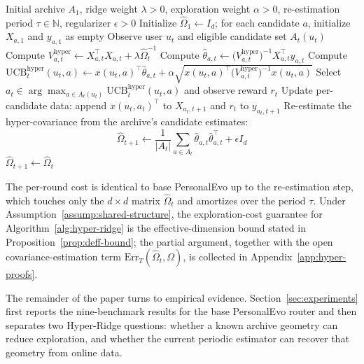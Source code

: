 \documentclass{article} %
\providecommand{\Err}{\mathrm{Err}}
\begin{document}
\begin{algorithm}[t]
\caption{Hyper-Ridge PersonalEvo routing}
\label{alg:hyper-ridge}
\begin{algorithmic}[1]
\Require Initial archive $A_1$, ridge weight $\lambda > 0$, exploration
  weight $\alpha > 0$, re-estimation period $\tau \in \mathbb{N}$,
  regularizer $\epsilon > 0$
\State Initialize $\widehat{\Omega}_1 \gets I_d$; for each candidate $a$,
  initialize $X_{a,1}$ and $y_{a,1}$ as empty
  \State Observe user $u_t$ and eligible candidate set $A_t(u_t)$
    \State Compute
      $V_{a,t}^{\mathrm{hyper}} \gets X_{a,t}^\top X_{a,t}
        + \lambda \widehat{\Omega}_t^{-1}$
    \State Compute
      $\widehat{\theta}_{a,t} \gets
        \bigl( V_{a,t}^{\mathrm{hyper}} \bigr)^{-1}
        X_{a,t}^\top y_{a,t}$
    \State Compute
      $\mathrm{UCB}_t^{\mathrm{hyper}}(u_t, a) \gets
        x(u_t, a)^\top \widehat{\theta}_{a,t}
        + \alpha \sqrt{ x(u_t, a)^\top
          \bigl( V_{a,t}^{\mathrm{hyper}} \bigr)^{-1} x(u_t, a) }$
  \EndFor
  \State Select
    $a_t \in \arg\max_{a \in A_t(u_t)} \mathrm{UCB}_t^{\mathrm{hyper}}(u_t, a)$
    and observe reward $r_t$
  \State Update per-candidate data: append $x(u_t, a_t)^\top$ to
    $X_{a_t, t+1}$ and $r_t$ to $y_{a_t, t+1}$
    \State Re-estimate the hyper-covariance from the archive's
      candidate estimates:
      \[
        \widehat{\Omega}_{t+1} \gets
          \frac{1}{|A_t|} \sum_{a \in A_t}
          \widehat{\theta}_{a,t} \widehat{\theta}_{a,t}^\top
          + \epsilon I_d
      \]
  \Else
    \State $\widehat{\Omega}_{t+1} \gets \widehat{\Omega}_t$
  \EndIf
\EndFor
\end{algorithmic}
\end{algorithm}

The per-round cost is identical to base PersonalEvo up to the
re-estimation step, which touches only the $d \times d$ matrix
$\widehat{\Omega}_t$ and amortizes over the period $\tau$. Under
Assumption~\ref{assump:shared-structure}, the exploration-cost guarantee for
Algorithm~\ref{alg:hyper-ridge} is the effective-dimension bound stated in
Proposition~\ref{prop:deff-bound}; the partial argument, together with the
open covariance-estimation term $\Err_T(\widehat{\Omega}_t, \Omega)$, is
collected in Appendix~\ref{app:hyper-proofs}.

The remainder of the paper turns to empirical evidence. Section~\ref{sec:experiments}
first reports the nine-benchmark results for the base PersonalEvo router and
then separates two Hyper-Ridge questions: whether a known archive geometry can
reduce exploration, and whether the current periodic estimator can recover that
geometry from online data.
\end{document}
